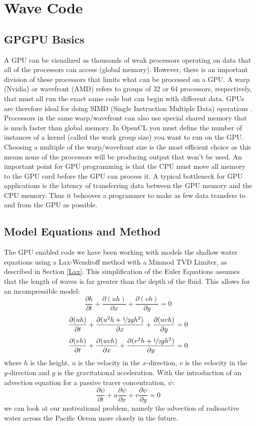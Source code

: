 \section{Wave Code}
\label{WaveCode}
\subsection{GPGPU Basics}
A GPU can be visualized as thousands of weak processors operating on data that all of the processors can access (global memory). However, there is an important division of these processors that limits what can be processed on a GPU. A warp (Nvidia) or wavefront (AMD) refers to groups of 32 or 64 processors, respectively, that must all run the exact same code but can begin with different data.  GPUs are therefore ideal for doing SIMD (Single Instruction Multiple Data) operations \cite{Satyamoorthy}. Processors in the same warp/wavefront can also use special shared memory that is much faster than global memory. In OpenCL you must define the number of instances of a kernel (called the work group size) you want to run on the GPU. Choosing a multiple of the warp/wavefront size is the most efficient choice as this means none of the processors will be producing output that won't be used.
An important point for GPU programming is that the CPU must move all memory to the GPU card before the GPU can process it. A typical bottleneck for GPU applications is the latency of transferring data between the GPU memory and the CPU memory. Thus it behooves a programmer to make as few data transfers to and from the GPU as possible.
\subsection{Model Equations and Method}
The GPU enabled code we have been working with models the shallow water equations using a Lax-Wendroff method with a Minmod TVD Limiter, as described in Section \ref{Lax}. This simplification of the Euler Equations assumes that the length of waves is far greater than the depth of the fluid. This allows for an incompressible model:
\[
\frac{\partial h}{\partial t} + \frac{\partial(uh)}{\partial x} + \frac{\partial(vh)}{\partial y} = 0
\] \[
\frac{\partial (uh)}{\partial t} + \frac{\partial(u^2h+\nicefrac{1}{2} g h^2)}{\partial x} + \frac{\partial(uvh)}{\partial y} = 0
\] \[
\frac{\partial (vh)}{\partial t} + \frac{\partial(uvh)}{\partial x}+ \frac{\partial(v^2h+\nicefrac{1}{2} g h^2)}{\partial y}  = 0
\]
where $h$ is the height, $u$ is the velocity in the $x$-direction, $v$ is the velocity in the $y$-direction and $g$ is the gravitational acceleration. With the introduction of an advection equation for a passive tracer concentration, $\psi$:
\[
\frac{\partial \psi}{\partial t} + u\frac{\partial \psi}{\partial x} + v\frac{\partial \psi}{\partial y} = 0
\]
we can look at our motivational problem, namely the advection of radioactive water across the Pacific Ocean more closely in the future.
